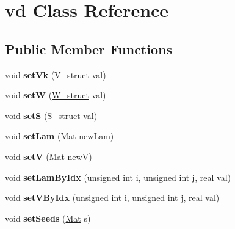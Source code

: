 \hypertarget{classvd}{}\section{vd Class Reference}
\label{classvd}
\subsection*{Public Member Functions}
\begin{DoxyCompactItemize}
\item 
\mbox{\label{classvd_a062d265bd642352d6f7e8cc8685ed7a8}} 
void {\bfseries set\+Vk} (\mbox{\hyperlink{structV__struct}{V\+\_\+struct}} val)
\item 
\mbox{\label{classvd_a85ee3a096c181f76d15f4b7fcf137fe7}} 
void {\bfseries setW} (\mbox{\hyperlink{structW__struct}{W\+\_\+struct}} val)
\item 
\mbox{\label{classvd_a36a19417f43a4316d0172a8ce3476e8e}} 
void {\bfseries setS} (\mbox{\hyperlink{structS__struct}{S\+\_\+struct}} val)
\item 
\mbox{\label{classvd_ae13e9e465d08425218bd8f85ce420c05}} 
void {\bfseries set\+Lam} (\mbox{\hyperlink{aux_8h_aa1fe91b8cd36c618282eb0d548690c4c}{Mat}} new\+Lam)
\item 
\mbox{\label{classvd_a33e792915ebd0295a3475fe686b41ee9}} 
void {\bfseries setV} (\mbox{\hyperlink{aux_8h_aa1fe91b8cd36c618282eb0d548690c4c}{Mat}} newV)
\item 
\mbox{\label{classvd_a772224a2d677a8f8a5cf86d27b5795c8}} 
void {\bfseries set\+Lam\+By\+Idx} (unsigned int i, unsigned int j, real val)
\item 
\mbox{\label{classvd_a53e18ea21521a36ab65a1de417466a9b}} 
void {\bfseries set\+V\+By\+Idx} (unsigned int i, unsigned int j, real val)
\item 
\mbox{\label{classvd_a739318bbb45d4facfcc1899c71b91720}} 
void {\bfseries set\+Seeds} (\mbox{\hyperlink{aux_8h_aa1fe91b8cd36c618282eb0d548690c4c}{Mat}} s)
\item 
\mbox{\label{classvd_a579df0c885a43bb876449889bbcba6cb}} 

\end{DoxyCompactItemize}
